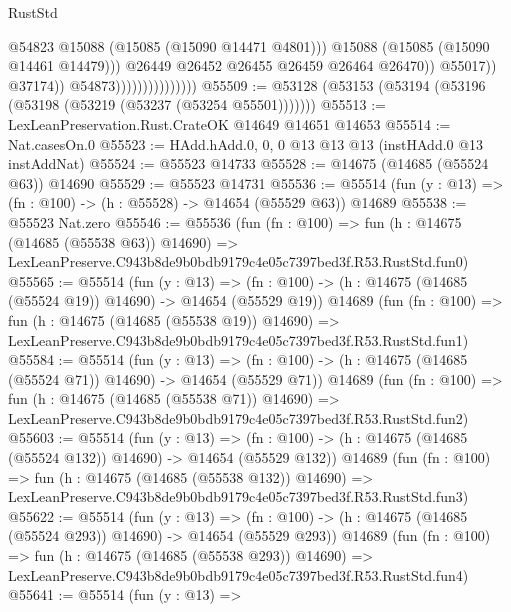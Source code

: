 \begin{lexlean}{RustStd}
\begin{coremodule}
                                                  @54823
                                                  @15088
                                                  (@15085 (@15090 @14471 @4801)))
                                                @15088
                                                (@15085 (@15090 @14461 @14479)))
                                              @26449
                                              @26452
                                              @26455
                                              @26459
                                              @26464
                                              @26470))
                                          @55017))
                                      @37174))
                                  @54873)))))))))))))))
@55509 := @53128 (@53153 (@53194 (@53196 (@53198 (@53219 (@53237 (@53254 @55501)))))))
@55513 := LexLeanPreservation.Rust.CrateOK @14649 @14651 @14653
@55514 := Nat.casesOn.{0}
@55523 := HAdd.hAdd.{0, 0, 0} @13 @13 @13 (instHAdd.{0} @13 instAddNat)
@55524 := @55523 @14733
@55528 := @14675 (@14685 (@55524 @63)) @14690
@55529 := @55523 @14731
@55536 := @55514 (fun (y : @13) => (fn : @100) -> (h : @55528) -> @14654 (@55529 @63)) @14689
@55538 := @55523 Nat.zero
@55546 := @55536
    (fun (fn : @100) =>
    fun (h : @14675 (@14685 (@55538 @63)) @14690) =>
    LexLeanPreserve.C943b8de9b0bdb9179c4e05c7397bed3f.R53.RustStd.fun0)
@55565 := @55514
    (fun (y : @13) =>
    (fn : @100) -> (h : @14675 (@14685 (@55524 @19)) @14690) -> @14654 (@55529 @19))
    @14689
    (fun (fn : @100) =>
    fun (h : @14675 (@14685 (@55538 @19)) @14690) =>
    LexLeanPreserve.C943b8de9b0bdb9179c4e05c7397bed3f.R53.RustStd.fun1)
@55584 := @55514
    (fun (y : @13) =>
    (fn : @100) -> (h : @14675 (@14685 (@55524 @71)) @14690) -> @14654 (@55529 @71))
    @14689
    (fun (fn : @100) =>
    fun (h : @14675 (@14685 (@55538 @71)) @14690) =>
    LexLeanPreserve.C943b8de9b0bdb9179c4e05c7397bed3f.R53.RustStd.fun2)
@55603 := @55514
    (fun (y : @13) =>
    (fn : @100) -> (h : @14675 (@14685 (@55524 @132)) @14690) -> @14654 (@55529 @132))
    @14689
    (fun (fn : @100) =>
    fun (h : @14675 (@14685 (@55538 @132)) @14690) =>
    LexLeanPreserve.C943b8de9b0bdb9179c4e05c7397bed3f.R53.RustStd.fun3)
@55622 := @55514
    (fun (y : @13) =>
    (fn : @100) -> (h : @14675 (@14685 (@55524 @293)) @14690) -> @14654 (@55529 @293))
    @14689
    (fun (fn : @100) =>
    fun (h : @14675 (@14685 (@55538 @293)) @14690) =>
    LexLeanPreserve.C943b8de9b0bdb9179c4e05c7397bed3f.R53.RustStd.fun4)
@55641 := @55514
    (fun (y : @13) =>

\end{coremodule}
\end{lexlean}

